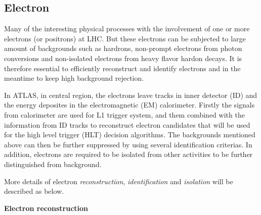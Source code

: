 \subsection{Electron}
\label{sec:electron}

Many of the interesting physical processes with the involvement of one or more electrons (or positrons) at LHC.
But these electrons can be subjected to large amount of backgrounds such as hardrons, non-prompt electrons from photon conversions and non-isolated electrons from heavy flavor hardon decays.
It is therefore essential to efficiently reconstruct and identify electrons and in the meantime to keep high background rejection.

In ATLAS, in central region, the electrons leave tracks in inner detector (ID) and the energy deposites in the electromagnetic (EM) calorimeter. 
Firstly the signals from calorimeter are used for L1 trigger system, and them combined with the information from ID tracks to reconstruct electron candidates that will be used for the high level trigger (HLT) decision algorithms\cite{ATLAS-CONF-2016-024}.
The backgrounds mentioned above can then be further suppressed by using several identification criterias.
In addition, electrons are required to be isolated from other activities to be further distinguished from background.

More details of electron \textit{reconstruction}, \textit{identification} and \textit{isolation} will be described as below.

\textbf{Electron reconstruction} 

